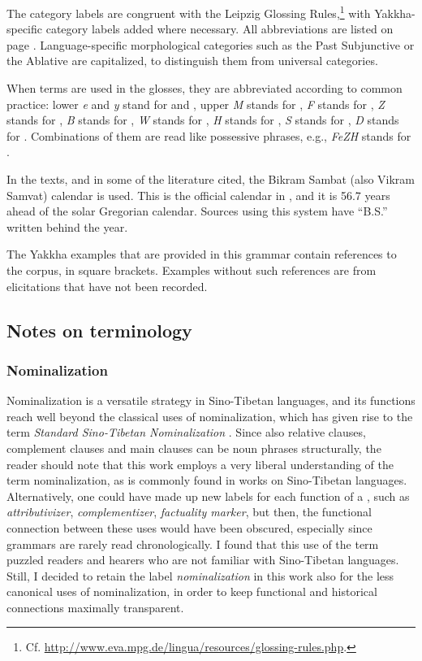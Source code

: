 The category labels are congruent with the Leipzig Glossing Rules,\footnote{Cf. \url{http://www.eva.mpg.de/lingua/resources/glossing-rules.php}.} with Yakkha-specific category labels added where necessary. All abbreviations are listed on page \pageref{abbreviations}. Language-specific morphological categories such as the Past Subjunctive  or the Ablative  are capitalized, to distinguish them from universal categories.

When  terms are used in the glosses, they are abbreviated according to common practice: lower   \emph{e} and \emph{y} stand for  and , upper  \emph{M} stands for , \emph{F} stands for , \emph{Z} stands for , \emph{B} stands for , \emph{W} stands for , \emph{H} stands for , \emph{S} stands for , \emph{D} stands for . Combinations of them are read like possessive phrases, e.g., \emph{FeZH} stands for . 


In the texts, and in some of the  literature cited, the Bikram Sambat (also Vikram Samvat) calendar is used. This is the official calendar in , and it is  56.7 years ahead of the solar Gregorian calendar. Sources using this system have ``B.S.'' written behind the year.

The Yakkha examples that are provided in this grammar contain references to the corpus, in square brackets. Examples without such references are from elicitations that have not been recorded.


\subsection{Notes on terminology}\label{terminology}

\subsubsection{Nominalization}

Nominalization is a versatile strategy in Sino-Tibetan languages, and its functions reach well beyond the classical uses of nominalization, which has given rise to the term \emph{Standard Sino-Tibetan Nominalization} \citep{Bickel1999Nominalization}. Since also relative clauses, complement clauses and main clauses can be noun phrases structurally, the reader should note that this work employs a very liberal understanding of the term nominalization, as is commonly found in works on Sino-Tibetan languages. Alternatively, one could have made up new labels for each function of  a , such as \emph{attributivizer}, \emph{complementizer}, \emph{factuality marker}, but then, the functional connection between these uses would have been obscured, especially since grammars are rarely read chronologically. I found that this use of the term puzzled readers and hearers who are not familiar with Sino-Tibetan languages. Still, I decided to retain the label \emph{nominalization} in this work also for the less canonical uses of nominalization, in order to keep functional and historical connections maximally transparent.

